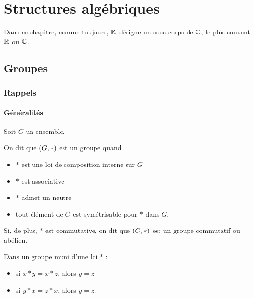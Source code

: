 \chapter{Structures algébriques}

\minitoc

Dans ce chapitre, comme toujours, \(\mathbb{K}\) désigne un sous-corps de \(\mathbb{C}\), le plus souvent \(\mathbb{R}\) ou \(\mathbb{C}\).

\section{Groupes}

\subsection{Rappels}

\subsubsection{Généralités}

\begin{defi}
Soit \(G\) un ensemble.

On dit que \(\groupe{G}[*]\) est un groupe quand

\begin{itemize}
    \item \(*\) est une loi de composition interne sur \(G\) \\
    \item \(*\) est associative \\
    \item \(*\) admet un neutre \\
    \item tout élément de \(G\) est symétrisable pour \(*\) dans \(G\).
\end{itemize}

Si, de plus, \(*\) est commutative, on dit que \(\groupe{G}[*]\) est un groupe commutatif ou abélien.
\end{defi}

\begin{prop}[Simplification]
Dans un groupe muni d'une loi \(*\) :

\begin{itemize}
    \item si \(x*y=x*z\), alors \(y=z\) \\
    \item si \(y*x=z*x\), alors \(y=z\).
\end{itemize}
\end{prop}

